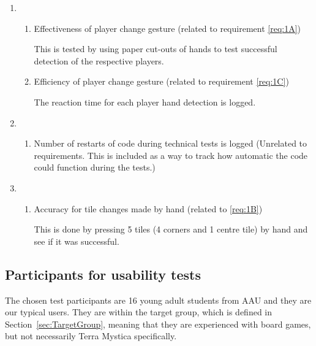 \begin{enumerate}
	
\item \begin{enumerate}
\item Effectiveness of player change gesture (related to requirement \ref{req:1A})

This is tested by using paper cut-outs of hands to test successful detection of the respective players.

\item Efficiency of player change gesture (related to requirement \ref{req:1C})

The reaction time for each player hand detection is logged.
\end{enumerate}
	\item \begin{enumerate}
		\item Number of restarts of code during technical tests is logged (Unrelated to requirements. This is included as a way to track how automatic the code could function during the tests.)
	\end{enumerate}
	\item \begin{enumerate}
		\item Accuracy for tile changes made by hand (related to \ref{req:1B})
		
		This is done by pressing 5 tiles (4 corners and 1 centre tile) by hand and see if it was successful.
	\end{enumerate}
\end{enumerate}

\subsection{Participants for usability tests}
The chosen test participants are 16 young adult students from AAU and they are our typical users. They are within the target group, which is defined in Section~\ref{sec:TargetGroup}, meaning that they are experienced with board games, but not necessarily Terra Mystica specifically. 

